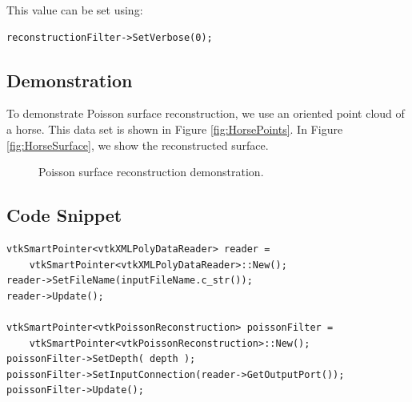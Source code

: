 \documentclass{InsightArticle}
\begin{document}
This value can be set using:
\begin{verbatim}
reconstructionFilter->SetVerbose(0);
\end{verbatim}


\subsection{Demonstration}
To demonstrate Poisson surface reconstruction, we use an oriented point cloud of a horse. This data set is shown in Figure \ref{fig:HorsePoints}. In Figure \ref{fig:HorseSurface}, we show the reconstructed surface.

\begin{figure}[H]
\centering
{}
\caption{Poisson surface reconstruction demonstration.}
\label{fig:SurfaceReconstruction}
\end{figure}

\subsection{Code Snippet}
\begin{verbatim}
vtkSmartPointer<vtkXMLPolyDataReader> reader =
	vtkSmartPointer<vtkXMLPolyDataReader>::New();
reader->SetFileName(inputFileName.c_str());
reader->Update();

vtkSmartPointer<vtkPoissonReconstruction> poissonFilter = 
	vtkSmartPointer<vtkPoissonReconstruction>::New();
poissonFilter->SetDepth( depth );
poissonFilter->SetInputConnection(reader->GetOutputPort());
poissonFilter->Update();
\end{verbatim}
\end{document}
